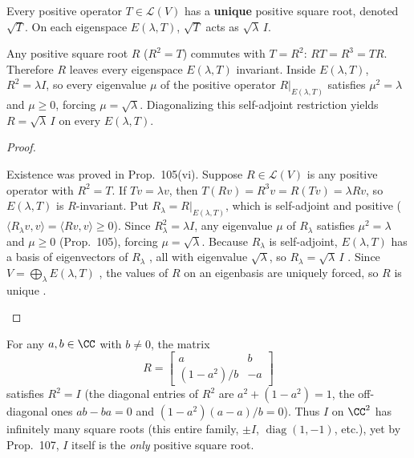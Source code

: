 \documentclass[10pt]{scrartcl}
\newcommand{\LL}{\mathcal L}\newcommand{\PP}{\mathcal P}\newcommand{\MM}{\mathcal M}
\begin{document}
\begin{theorem*}
  Every positive operator $T\in\LL(V)$ has a \textbf{unique} positive square root, denoted $\sqrt{T}$. On each eigenspace $E(\lambda,T)$, $\sqrt{T}$ acts as $\sqrt{\lambda}\,I$.
\end{theorem*}
\begin{ideabox}
  Any positive square root $R$ ($R^2=T$) commutes with $T=R^2$: $RT=R^3=TR$. Therefore $R$ leaves every eigenspace $E(\lambda,T)$ invariant. Inside $E(\lambda,T)$, $R^2=\lambda I$, so every eigenvalue $\mu$ of the positive operator $R|_{E(\lambda,T)}$ satisfies $\mu^2=\lambda$ and $\mu\ge0$, forcing $\mu=\sqrt{\lambda}$. Diagonalizing this self-adjoint restriction yields $R=\sqrt{\lambda}\,I$ on every $E(\lambda,T)$.
\end{ideabox}
\begin{proof}
  \begin{steps}
    \ii Existence was proved in Prop.~105(vi). Suppose $R\in\LL(V)$ is any positive operator with $R^2=T$.
    \ii If $Tv=\lambda v$, then $T(Rv)=R^3v=R(Tv)=\lambda Rv$, so $E(\lambda,T)$ is $R$-invariant. Put $R_\lambda=R|_{E(\lambda,T)}$, which is self-adjoint  and positive ($\langle R_\lambda v,v\rangle=\langle Rv,v\rangle\ge0$).
    \ii Since $R_\lambda^2=\lambda I$, any eigenvalue $\mu$ of $R_\lambda$ satisfies $\mu^2=\lambda$ and $\mu\ge0$ (Prop.~105), forcing $\mu=\sqrt{\lambda}$. Because $R_\lambda$ is self-adjoint, $E(\lambda,T)$ has a basis of eigenvectors of $R_\lambda$ , all with eigenvalue $\sqrt{\lambda}$, so $R_\lambda=\sqrt{\lambda}\,I$ .
    \ii Since $V=\bigoplus_\lambda E(\lambda,T)$ , the values of $R$ on an eigenbasis are uniquely forced, so $R$ is unique .
  \end{steps}
\end{proof}

\begin{example*}
  For any $a,b\in\CC$ with $b\neq0$, the matrix
  \[ R=\begin{bmatrix}a&b\\(1-a^2)/b&-a\end{bmatrix} \]
  satisfies $R^2=I$ (the diagonal entries of $R^2$ are $a^2+(1-a^2)=1$, the off-diagonal ones $ab-ba=0$ and $(1-a^2)(a-a)/b=0$). Thus $I$ on $\CC^2$ has infinitely many square roots (this entire family, $\pm I$, $\operatorname{diag}(1,-1)$, etc.), yet by Prop.~107, $I$ itself is the \emph{only} positive square root.
\end{example*}
\end{document}
